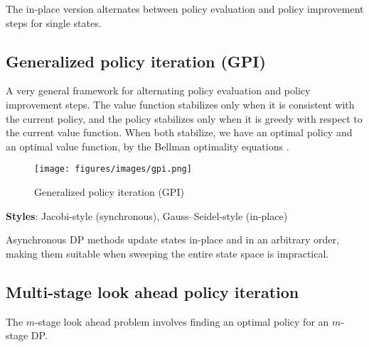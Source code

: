The in-place version alternates between policy evaluation and policy improvement steps for single states.

\subsection{Generalized policy iteration (GPI)}

A very general framework for alternating policy evaluation and policy improvement steps.
The value function stabilizes only when it is consistent with the current policy, and the policy stabilizes only when it is greedy with respect to the current value function.
When both stabilize, we have an optimal policy and an optimal value function, by the Bellman optimality equations .

\begin{figure}[ht]
    \centering
    \texttt{[image: figures/images/gpi.png]}
    \vspace*{-0.5em}
    \caption{Generalized policy iteration (GPI)}
\end{figure}

\textbf{Styles}: Jacobi-style (synchronous), Gauss–Seidel-style (in-place)

Asynchronous DP methods update states in-place and in an arbitrary order, making them suitable when sweeping the entire state space is impractical.

\subsection{Multi-stage look ahead policy iteration}

The \( m \)-stage look ahead problem involves finding an optimal policy for an \( m \)-stage DP.\@
